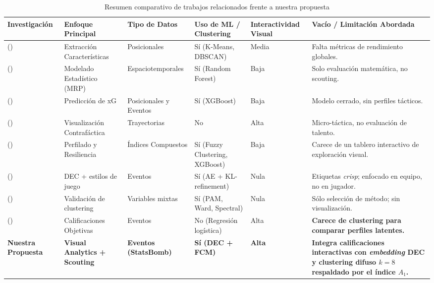 \documentclass[conference]{IEEEtran}
\begin{document}
\begin{table}
\centering
\caption{Resumen comparativo de trabajos relacionados frente a nuestra propuesta}
\label{tab:related_works}
\footnotesize
\setlength{\tabcolsep}{4pt}
\begin{tabular}{@{}p{2.3cm} p{2.2cm} p{1.8cm} p{2.5cm} p{1.4cm} p{2.7cm}@{}}
\toprule
\textbf{Investigación} & \textbf{Enfoque Principal} & \textbf{Tipo de Datos} & \textbf{Uso de ML / Clustering} & \textbf{Interactividad Visual} & \textbf{Vacío / Limitación Abordada} \\ \midrule
\citeauthor{janetzko2014feature} (\citeyear{janetzko2014feature}) & Extracción Características & Posicionales & Sí (K-Means, DBSCAN) & Media & Falta métricas de rendimiento globales. \\
\citeauthor{zhao2017visual} (\citeyear{zhao2017visual}) & Modelado Estadístico (MRP) & Espaciotemporales & Sí (Random Forest) & Baja & Solo evaluación matemática, no scouting. \\
\citeauthor{anzer2021goal} (\citeyear{anzer2021goal}) & Predicción de xG & Posicionales y Eventos & Sí (XGBoost) & Baja & Modelo cerrado, sin perfiles tácticos. \\
\citeauthor{stein2019where} (\citeyear{stein2019where}) & Visualización Contrafáctica & Trayectorias & No & Alta & Micro-táctica, no evaluación de talento. \\
\citeauthor{pacifico2025fuzzy} (\citeyear{pacifico2025fuzzy}) & Perfilado y Resiliencia & Índices Compuestos & Sí (Fuzzy Clustering, XGBoost) & Baja & Carece de un tablero interactivo de exploración visual. \\
\citeauthor{demir2026how} (\citeyear{demir2026how}) & DEC + estilos de juego & Eventos & Sí (AE + KL-refinement) & Nula & Etiquetas \textit{crisp}; enfocado en equipo, no en jugador. \\
\citeauthor{akhanli2022clustering} (\citeyear{akhanli2022clustering}) & Validación de clustering & Variables mixtas & Sí (PAM, Ward, Spectral) & Nula & Sólo selección de método; sin visualización. \\
\citeauthor{evers2024visual} (\citeyear{evers2024visual}) & Calificaciones Objetivas & Eventos & No (Regresión logística) & Alta & \textbf{Carece de clustering para comparar perfiles latentes.} \\ \midrule
\textbf{Nuestra Propuesta} & \textbf{Visual Analytics + Scouting} & \textbf{Eventos (StatsBomb)} & \textbf{Sí (DEC + FCM)} & \textbf{Alta} & \textbf{Integra calificaciones interactivas con \textit{embedding} DEC y clustering difuso $k=8$ respaldado por el índice $A_1$.} \\ \bottomrule
\end{tabular}
\end{table}
\end{document}
